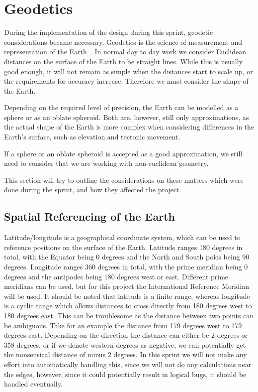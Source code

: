 \section{Geodetics}

During the implementation of the design during this sprint, geodetic considerations became necessary. Geodetics is the science of measurement and representation of the Earth~\cite{website:Wikipedia-geodesy}. In normal day to day work we consider Euclidean distances on the surface of the Earth to be straight lines. While this is usually good enough, it will not remain as simple when the distances start to scale up, or the requirements for accuracy increase. Therefore we must consider the shape of the Earth.

Depending on the required level of precision, the Earth can be modelled as a sphere or as an oblate spheroid\cite{}. Both are, however, still only approximations, as the actual shape of the Earth is more complex when considering differences in the Earth's surface, such as elevation and tectonic movement.

If a sphere or an oblate spheroid is accepted as a good approximation, we still need to consider that we are working with non-euclidean geometry.

This section will try to outline the considerations on these matters which were done during the sprint, and how they affected the project.

\subsection{Spatial Referencing of the Earth}

Latitude/longitude is a geographical coordinate system, which can be used to reference positions on the surface of the Earth. Latitude ranges 180 degrees in total, with the Equator being 0 degrees and the North and South poles being 90 degrees\cite{}. Longitude ranges 360 degrees in total, with the prime meridian being 0 degrees and the antipodes being 180 degrees west or east\cite{}. Different prime meridians can be used, but for this project the International Reference Meridian will be used\cite{}. It should be noted that latitude is a finite range, whereas longitude is a cyclic range which allows distances to cross directly from 180 degrees west to 180 degrees east. This can be troublesome as the distance between two points can be ambiguous. Take for an example the distance from 179 degrees west to 179 degrees east. Depending on the direction the distance can either be 2 degrees or 358 degrees, or if we denote western degrees as negative, we can potentially get the nonsensical distance of minus 2 degrees. In this sprint we will not make any effort into automatically handling this, since we will not do any calculations near the edges, however, since it could potentially result in logical bugs, it should be handled eventually.

